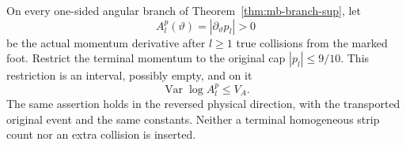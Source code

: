\begin{lemma}
\label{lem:ab-momentum-variation}
On every one-sided angular branch of
Theorem~\ref{thm:mb-branch-sup}, let
\[
 A_l^p(\vartheta)=|\partial_\vartheta p_l|>0
\]
be the actual momentum derivative after $l\ge1$ true collisions
from the marked foot.  Restrict the terminal momentum to the original
cap $|p_l|\le9/10$.  This restriction is an interval, possibly empty,
and on it
\begin{equation}\label{eq:ab-momentum-variation}
             \operatorname{Var}\log A_l^p\le V_A.
\end{equation}
The same assertion holds in the reversed physical direction, with
the transported original event and the same constants.  Neither a
terminal homogeneous strip count nor an extra collision is inserted.
\end{lemma}
